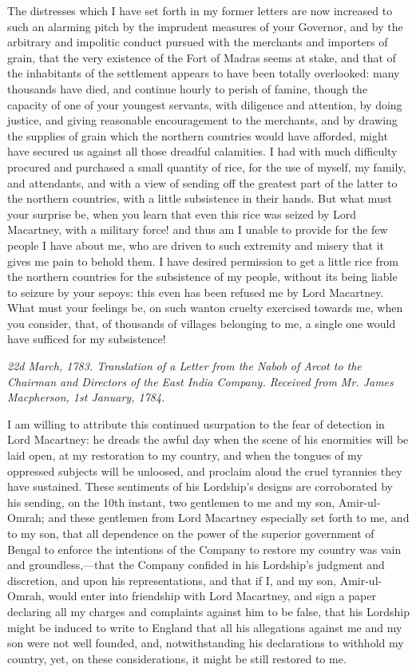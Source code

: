 The distresses which I have set forth in my former letters are now increased to such an alarming pitch by the imprudent measures of your Governor, and by the arbitrary and impolitic conduct pursued with the merchants and importers of grain, that the very existence of the Fort of Madras seems at stake, and that of the inhabitants of the settlement appears to have been totally overlooked: many thousands have died, and continue hourly to perish of famine, though the capacity of one of your youngest servants, with diligence and attention, by doing justice, and giving reasonable encouragement to the merchants, and by drawing the supplies of grain which the northern countries would have afforded, might have secured us against all those dreadful calamities. I had with much difficulty procured and purchased a small quantity of rice, for the use of myself, my family, and attendants, and with a view of sending off the greatest part of the latter to the northern countries, with a little subsistence in their hands. But what must your surprise be, when you learn that even this rice was seized by Lord Macartney, with a military force! and thus am I unable to provide for the few people I have about me, who are driven to such extremity and misery that it gives me pain to behold them. I have desired permission to get a little rice from the northern countries for the subsistence of my people, without its being liable to seizure by your sepoys: this even has been refused me by Lord Macartney. What must your feelings be, on such wanton cruelty exercised towards me, when you consider, that, of thousands of villages belonging to me, a single one would have sufficed for my subsistence!

\PRLsep

\textit{22d March, 1783. Translation of a Letter from the Nabob of Arcot to the Chairman and Directors of the East India Company. Received from Mr. James Macpherson, 1st January, 1784.}
\vspace{0.3cm}

I am willing to attribute this continued usurpation to the fear of detection in Lord Macartney: he dreads the awful day when the scene of his enormities will be laid open, at my restoration to my country, and when the tongues of my oppressed subjects will be unloosed, and proclaim aloud the cruel tyrannies they have sustained. These sentiments of his Lordship's designs are corroborated by his sending, on the 10th instant, two gentlemen to me and my son, Amir-ul-Omrah; and these gentlemen from Lord Macartney especially set forth to me, and to my son, that all dependence on the power of the superior government of Bengal to enforce the intentions of the Company to restore my country was vain and groundless,—that the Company confided in his Lordship's judgment and discretion, and upon his representations, and that if I, and my son, Amir-ul-Omrah, would enter into friendship with Lord Macartney, and sign a paper declaring all my charges and complaints against him to be false, that his Lordship might be induced to write to England that all his allegations against me and my son were not well founded, and, notwithstanding his declarations to withhold my country, yet, on these considerations, it might be still restored to me.

